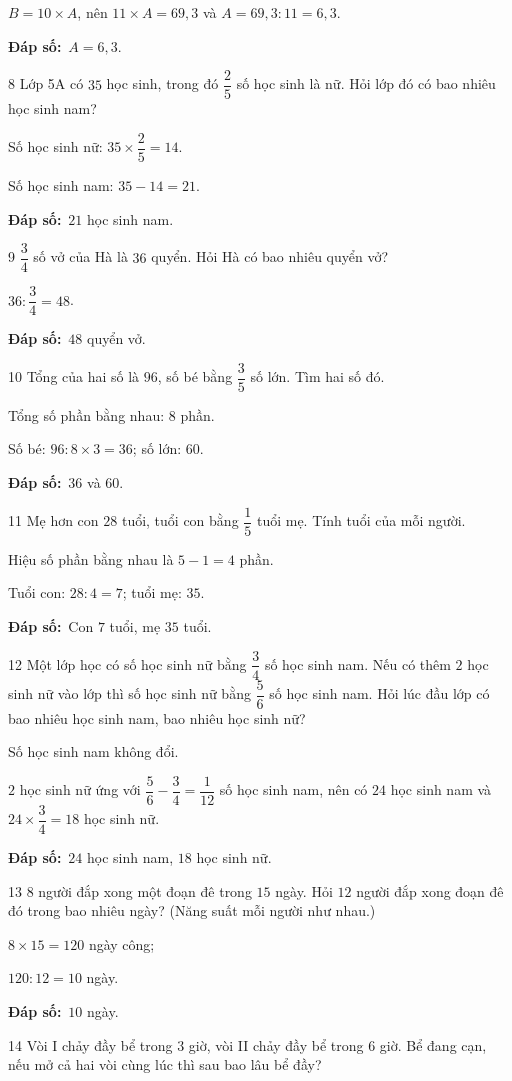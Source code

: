 \documentclass[11pt]{article}
\newif\ifsol \solfalse
\providecommand{\AnsWord}{Đáp số}
\newcommand{\dapso}[1]{\par\textbf{\AnsWord:}\ #1}
\newcommand{\probsol}[1]{%
  \begin{lrbox}{\solmeasure}\begin{minipage}{\dimexpr\linewidth-24pt\relax}#1\end{minipage}\end{lrbox}%
  \ifsol
    \begin{solbox}#1\end{solbox}%
  \else
    \setlength{\solht}{\dimexpr\ht\solmeasure+\dp\solmeasure+0.85cm\relax}%
    \ifdim\solht<1.35cm\setlength{\solht}{1.35cm}\fi
    \begin{tcolorbox}[colback=white,colframe=Line,boxrule=0.8pt,arc=5pt,
      left=8pt,right=8pt,top=4pt,bottom=4pt,height=\solht]{\footnotesize\color{Slate}\itshape\WorkWord}\end{tcolorbox}%
  \fi}
\newcommand{\gap}{\vspace{0.3cm}}
\def\WorkWord{Bài làm:}
\def\AnsWord{Đáp số}
\begin{document}
\probsol{
$B=10\times A$, nên $11\times A=69{,}3$ và $A=69{,}3:11=6{,}3$.
\dapso{$A=6{,}3$.}}
\gap
\begin{probbox}{8}{\relax}
Lớp 5A có $35$ học sinh, trong đó $\dfrac25$ số học sinh là nữ. Hỏi lớp đó có bao nhiêu học sinh nam?
\end{probbox}
\probsol{
Số học sinh nữ: $35\times\dfrac25=14$.\par Số học sinh nam: $35-14=21$.
\dapso{$21$ học sinh nam.}}
\gap
\begin{probbox}{9}{\relax}
$\dfrac34$ số vở của Hà là $36$ quyển. Hỏi Hà có bao nhiêu quyển vở?
\end{probbox}
\probsol{
$36:\dfrac34=48$.
\dapso{$48$ quyển vở.}}
\gap
\begin{probbox}{10}{\relax}
Tổng của hai số là $96$, số bé bằng $\dfrac35$ số lớn. Tìm hai số đó.
\end{probbox}
\probsol{
Tổng số phần bằng nhau: $8$ phần.\par Số bé: $96:8\times3=36$; số lớn: $60$.
\dapso{$36$ và $60$.}}
\gap
\begin{probbox}{11}{\relax}
Mẹ hơn con $28$ tuổi, tuổi con bằng $\dfrac15$ tuổi mẹ. Tính tuổi của mỗi người.
\end{probbox}
\probsol{
Hiệu số phần bằng nhau là $5-1=4$ phần.\par Tuổi con: $28:4=7$; tuổi mẹ: $35$.
\dapso{Con $7$ tuổi, mẹ $35$ tuổi.}}
\gap
\begin{probbox}{12}{\relax}
Một lớp học có số học sinh nữ bằng $\dfrac34$ số học sinh nam. Nếu có thêm $2$ học sinh nữ vào lớp thì số học sinh nữ bằng $\dfrac56$ số học sinh nam. Hỏi lúc đầu lớp có bao nhiêu học sinh nam, bao nhiêu học sinh nữ?
\end{probbox}
\probsol{
Số học sinh nam không đổi.\par $2$ học sinh nữ ứng với $\dfrac56-\dfrac34=\dfrac1{12}$ số học sinh nam, nên có $24$ học sinh nam và $24\times\dfrac34=18$ học sinh nữ.
\dapso{$24$ học sinh nam, $18$ học sinh nữ.}}
\gap
\begin{probbox}{13}{\relax}
$8$ người đắp xong một đoạn đê trong $15$ ngày. Hỏi $12$ người đắp xong đoạn đê đó trong bao nhiêu ngày? (Năng suất mỗi người như nhau.)
\end{probbox}
\probsol{
$8\times15=120$ ngày công;\par $120:12=10$ ngày.
\dapso{$10$ ngày.}}
\gap
\begin{probbox}{14}{\relax}
Vòi I chảy đầy bể trong $3$ giờ, vòi II chảy đầy bể trong $6$ giờ. Bể đang cạn, nếu mở cả hai vòi cùng lúc thì sau bao lâu bể đầy?
\end{probbox}
\end{document}
